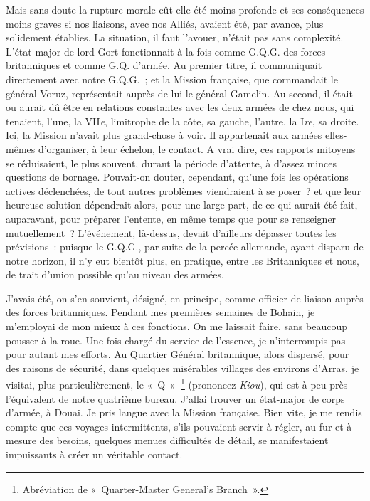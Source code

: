 \documentclass[french,twoside]{book} %
\begin{document}
Mais sans doute la rupture morale eût-elle été moins profonde et ses conséquences moins graves si nos liaisons, avec nos Alliés, avaient été, par avance, plus solidement établies. La situation, il faut l’avouer, n’était pas sans complexité. L’état-major de lord Gort fonctionnait à la fois comme G.Q.G. des forces britanniques et comme G.Q. d’armée. Au premier titre, il communiquait directement avec notre G.Q.G. ; et la Mission française, que cornmandait le général Voruz, représentait auprès de lui le général Gamelin. Au second, il était ou aurait dû être en relations constantes avec les deux armées de chez nous, qui tenaient, l’une, la VII\emph{e}, limitrophe de la côte, sa gauche, l’autre, la I\emph{re}, sa droite. Ici, la Mission n’avait plus grand-chose à voir. Il appartenait aux armées elles-mêmes d’organiser, à leur échelon, le contact. A vrai dire, ces rapports mitoyens se réduisaient, le plus souvent, durant la période d’attente, à d’assez minces questions de   bornage. Pouvait-on douter, cependant, qu’une fois les opérations actives déclenchées, de tout autres problèmes viendraient à se poser ? et que leur heureuse solution dépendrait alors, pour une large part, de ce qui aurait été fait, auparavant, pour préparer l’entente, en même temps que pour se renseigner mutuellement ? L’événement, là-dessus, devait d’ailleurs dépasser toutes les prévisions : puisque le G.Q.G., par suite de la percée allemande, ayant disparu de notre horizon, il n’y eut bientôt plus, en pratique, entre les Britanniques et nous, de trait d’union possible qu’au niveau des armées.\par
J’avais été, on s’en souvient, désigné, en principe, comme officier de liaison auprès des forces britanniques. Pendant mes premières semaines de Bohain, je m’employai de mon mieux à ces fonctions. On me laissait faire, sans beaucoup pousser à la roue. Une fois chargé du service de l’essence, je n’interrompis pas pour autant mes efforts. Au Quartier Général britannique, alors dispersé, pour des raisons de sécurité, dans quelques misérables villages des environs d’Arras, je visitai, plus particulièrement, le « Q » \footnote{Abréviation de « Quarter-Master General’s Branch ».} (prononcez \emph{Kiou}), qui est à peu près l’équivalent de notre quatrième bureau. J’allai trouver un état-major de corps d’armée, à Douai. Je pris langue avec la Mission française. Bien vite, je me rendis compte que ces voyages intermittents, s’ils pouvaient servir à régler, au fur et à mesure des besoins, quelques menues difficultés de détail, se manifestaient impuissants à créer un véritable contact.\par
\end{document}
